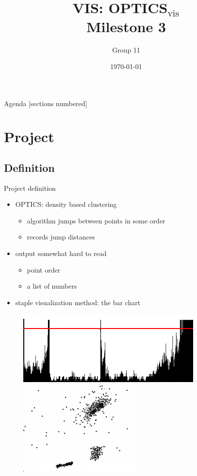 \documentclass[naustrian]{beamer}
\title{VIS: OPTICS$_\text{vis}$\\Milestone 3}
\date{\today}
\author{Group 11}
\institute{Fakultät für Informatik}
\begin{document}
\maketitle

\begin{frame}{Agenda}
    [sections numbered]
    \tableofcontents
\end{frame}

\section{Project}

\subsection{Definition}

\begin{frame}{Project definition}
    \begin{itemize}
        \item OPTICS: density based clustering
            \begin{itemize}
                \item algorithm jumps between points in some order
                \item records jump distances
            \end{itemize}
        \item output somewhat hard to read
            \begin{itemize}
                \item point order
                \item a list of numbers
            \end{itemize}
        \item staple visualization method: the bar chart
    \end{itemize}
    \begin{figure}[h]
        \centering
        \includegraphics[height=.3\textheight]{img/optics-edited}
        \vspace{1em}
        \includegraphics[width=.3\textwidth]{img/optics-edited-points-black}
    \end{figure}
\end{frame}
\end{document}
